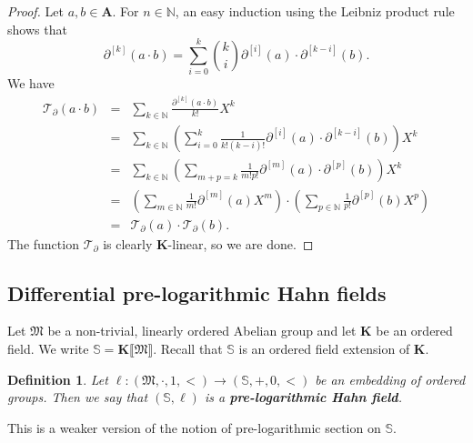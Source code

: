 \documentclass{article}
\newcommand{\of}{:}
\newcommand{\tmem}[1]{{\em #1\/}}
\newcommand{\tmstrong}[1]{\textbf{#1}}
\newtheorem{definition}[theorem]{Definition}
\theoremstyle{remark}\newtheorem*{convention*}{Convention}
\begin{document}
\begin{proof}
  Let $a, b \in \mathbf{A}$. For $n \in \mathbb{N}$, an easy induction using
  the Leibniz product rule shows that
  \[ \partial^{[k]} (a \cdot b) = \sum_{i = 0}^k \binom{k}{i} \partial^{[i]}
     (a) \cdot \partial^{[k - i]} (b) . \]
  We have
  \begin{eqnarray*}
    \mathcal{T}_{\partial} (a \cdot b) & = & \sum_{k \in \mathbb{N}}
    \frac{\partial^{[k]} (a \cdot b)}{k!} X^k\\
    & = & \sum_{k \in \mathbb{N}} \left( \sum_{i = 0}^k \frac{1}{k! (k - i)
    !} \partial^{[i]} (a) \cdot \partial^{[k - i]} (b) \right) X^k\\
    & = & \sum_{k \in \mathbb{N}} \left( \sum_{m + p = k} \frac{1}{m!p!}
    \partial^{[m]} (a) \cdot \partial^{[p]} (b) \right) X^k\\
    & = & \left( \sum_{m \in \mathbb{N}} \frac{1}{m!} \partial^{[m]} (a) X^m
    \right) \cdot \left( \sum_{p \in \mathbb{N}} \frac{1}{p!} \partial^{[p]}
    (b) X^p \right)\\
    & = & \mathcal{T}_{\partial} (a) \cdot \mathcal{T}_{\partial} (b) .
  \end{eqnarray*}
  The function $\mathcal{T}_{\partial}$ is clearly $\mathbf{K}$-linear, so we
  are done.
\end{proof}

\subsection{Differential pre-logarithmic Hahn fields}

Let $\mathfrak{M}$ be a non-trivial, linearly ordered Abelian group and let
$\mathbf{K}$ be an ordered field. We write $\mathbb{S}= \mathbf{K} \llbracket
\mathfrak{M} \rrbracket$. Recall that $\mathbb{S}$ is an ordered field
extension of $\mathbf{K}$.

\begin{definition}
  Let $\ell \of (\mathfrak{M}, \cdot, 1, <) \longrightarrow (\mathbb{S}, +, 0,
  <)$ be an embedding of ordered groups. Then we say that $(\mathbb{S}, \ell)$
  is a {\tmem{{\tmstrong{pre-logarithmic Hahn field}}}}{}.
\end{definition}

This is a weaker version of the notion of pre-logarithmic section
{\cite[Definition~2.7]{KM11}} on $\mathbb{S}$.
\end{document}
